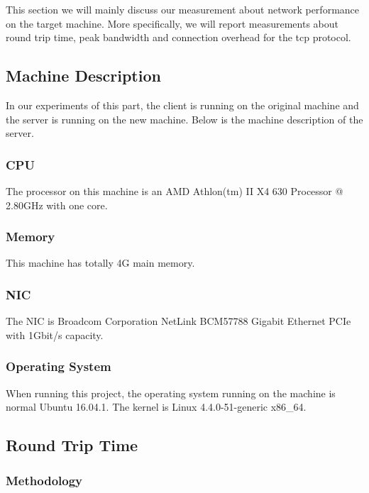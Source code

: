 
% 

This section we will mainly discuss our measurement about network performance on the target machine. More specifically, we will report measurements about round trip time, peak bandwidth and connection overhead for the tcp protocol.

\subsection{Machine Description}
In our experiments of this part, the client is running on the original machine and the server is running on the new machine. Below is the machine description of the server.

\subsubsection{CPU}

The processor on this machine is an AMD Athlon(tm) II X4 630 Processor @ 2.80GHz with one core.

\subsubsection{Memory}

This machine has totally 4G main memory.

\subsubsection{NIC}

The NIC is Broadcom Corporation NetLink BCM57788 Gigabit Ethernet PCIe with 1Gbit/s capacity.

\subsubsection{Operating System}
When running this project, the operating system running on the machine is normal Ubuntu 16.04.1. The kernel is Linux 4.4.0-51-generic x86\_64.

\subsection{Round Trip Time}

\subsubsection{Methodology}

